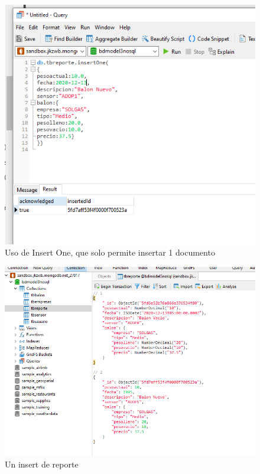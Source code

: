 \documentclass[twoside,twocolumn]{article}
\begin{document}
\begin{itemize}
\begin{figure}[h!]
\centering
\includegraphics[scale=0.35]{Image/insertOneReporte.PNG}
\caption{Uso de Insert One, que solo permite insertar 1 documento}
\label{fig:Csha3}
\end{figure}

\begin{figure}[h!]
\centering
\includegraphics[scale=0.35]{Image/insertOneReporteEfectivo.PNG}
\caption{Un insert de reporte}
\label{fig:Csha3}
\end{figure}


\end{itemize}
\end{document}
